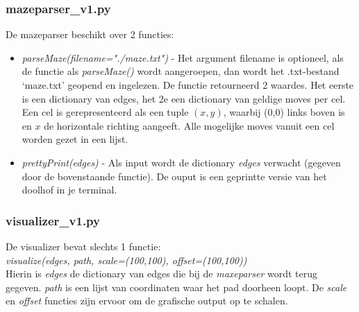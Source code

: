 \documentclass[a4paper]{article}
\begin{document}
\subsubsection{mazeparser\_v1.py}
De mazeparser beschikt over 2 functies:
\begin{itemize}
\item \textit{parseMaze(filename="./maze.txt")} - Het argument filename is optioneel, als de functie als \textit{parseMaze()} wordt aangeroepen, dan wordt het .txt-bestand `maze.txt' geopend en ingelezen. De functie retourneerd 2 waardes. Het eerste is een dictionary van edges, het 2e een dictionary van geldige moves per cel. Een cel is gerepresenteerd als een tuple $(x,y)$, waarbij (0,0) links boven is en $x$ de horizontale richting aangeeft. Alle mogelijke moves vanuit een cel worden gezet in een lijst.
\item \textit{prettyPrint(edges)} - Als input wordt de dictionary \textit{edges} verwacht (gegeven door de bovenstaande functie). De ouput is een geprintte versie van het doolhof in je terminal.
\end{itemize}

\subsubsection{visualizer\_v1.py}
De visualizer bevat slechts 1 functie: \\
\textit{visualize(edges, path, scale=(100,100), offset=(100,100))}\\
Hierin is \textit{edges} de dictionary van edges die bij de \textit{maxeparser} wordt terug gegeven. \textit{path} is een lijst van coordinaten waar het pad doorheen loopt. De \textit{scale} en \textit{offset} functies zijn ervoor om de grafische output op te schalen.
\end{document}
